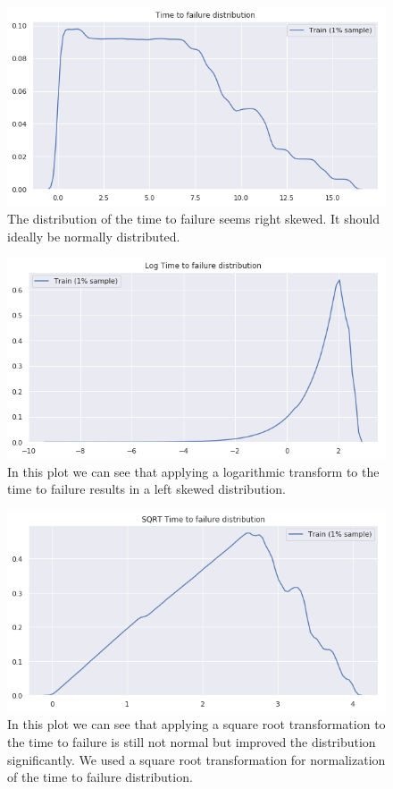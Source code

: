 \documentclass[]{llncs} %
\begin{document}
\begin{figure}
	\centering
	\includegraphics[width=.9\linewidth]{timeToFailureDistribution}
	\caption{The distribution of the time to failure seems right skewed. It should ideally be normally distributed.}
	\label{fig:timeToFailureDistribution}
\end{figure}
\begin{figure}
	\centering
	\includegraphics[width=.9\linewidth]{logTimeToFailureDistribution}
	\caption{In this plot we can see that applying a logarithmic transform to the time to failure results in a left skewed distribution.}
	\label{fig:logTimeToFailureDistribution}
\end{figure}
\begin{figure}
	\centering
	\includegraphics[width=.9\linewidth]{sqrtTimeToFailureDistribution}
	\caption{ In this plot we can see that applying a square root transformation to the time to failure is still not normal but improved the distribution significantly. We used a square root transformation for normalization of the time to failure distribution.}
	\label{fig:sqrtTimeToFailureDistribution}
\end{figure}
\clearpage
\newpage
\end{document}
